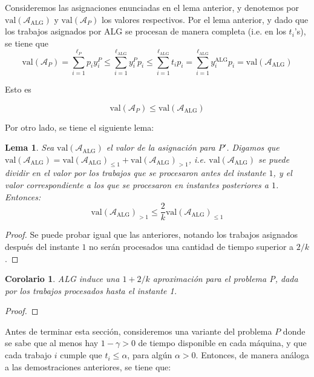 \documentclass[10pt]{article}
\newcommand{\val}[1]{\text{val}(#1)}
\theoremstyle{plain}
\newtheorem{lem}{Lema}
\newtheorem{cor}{Corolario}
\theoremstyle{definition}
\begin{document}
Consideremos las asignaciones enunciadas en el lema anterior, y denotemos por $\val{\mathcal{A}_{\text{ALG}}}$ y $\val{\mathcal{A}_P}$ los valores respectivos. Por el lema anterior, y dado que los trabajos asignados por ALG se procesan de manera completa (i.e. en los $t_i$'s), se tiene que
$$
\val{\mathcal{A}_P} = \sum_{i = 1}^{\ell_P} p_i y^P_i \leq \sum_{i = 1}^{\ell_{\text{ALG}}} y^P_i p_i \leq \sum_{i = 1}^{\ell_{\text{ALG}}}t_i p_i=\sum_{i = 1}^{\ell_{\text{ALG}}} y^{\text{ALG}}_i p_i=\val{\mathcal{A}_{\text{ALG}}}
$$

Esto es

\begin{equation}
\label{eq:PauxMayorP}
\val{\mathcal{A}_P} \leq \val{\mathcal{A}_{\text{ALG}}}
\end{equation}

Por otro lado, se tiene el siguiente lema:

\begin{lem}
\label{lem:cotaExtra}
Sea $\val{\mathcal{A}_{\text{ALG}}}$ el valor de la asignación para $P'$. Digamos que $\val{\mathcal{A}_{\text{ALG}}}=\val{\mathcal{A}_{\text{ALG}}}_{\leq 1} + \val{\mathcal{A}_{\text{ALG}}}_{>1}$, i.e. $\val{\mathcal{A}_{\text{ALG}}}$ se puede dividir en el valor por los trabajos que se procesaron antes del instante $1$, y el valor correspondiente a los que se procesaron en instantes posteriores a $1$. Entonces:
\begin{equation}
\label{eq:cotaExtra}
\val{\mathcal{A}_{\text{ALG}}}_{> 1} \leq \frac{2}{k} \val{\mathcal{A}_{\text{ALG}}}_{\leq 1}
\end{equation}
\end{lem}

\begin{proof}
Se puede probar igual que las anteriores, notando los trabajos asignados después del instante $1$ no serán procesados  una cantidad de tiempo superior a $2/k$. 
\end{proof}

\begin{cor}
ALG induce una $1+2/k$ aproximación para el problema P, dada por los trabajos procesados hasta el instante 1.
\end{cor}
\begin{proof}

\end{proof}

Antes de terminar esta sección, consideremos una variante del problema $P$ donde se sabe que al menos hay $1-\gamma>0$ de tiempo disponible en cada máquina, y que cada trabajo $i$ cumple que $t_i \leq \alpha$, para algún $\alpha >0$. Entonces, de manera análoga a las demostraciones anteriores, se tiene que:
\end{document}

